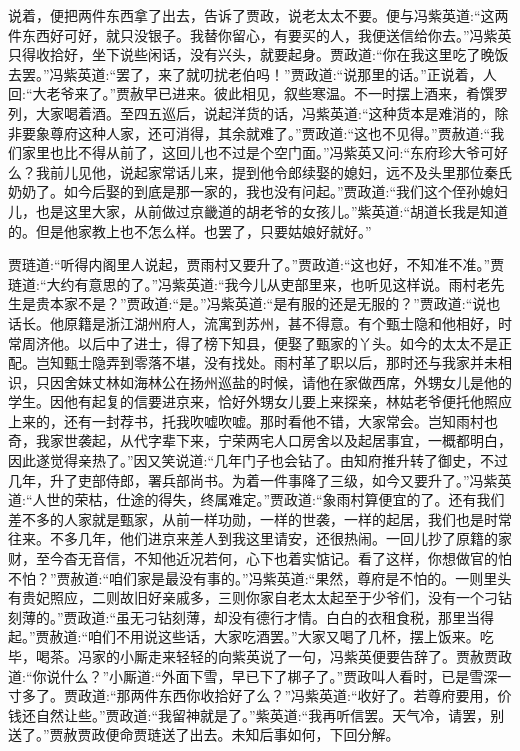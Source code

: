 \begin{parag}
    说着，便把两件东西拿了出去，告诉了贾政，说老太太不要。便与冯紫英道:“这两件东西好可好，就只没银子。我替你留心，有要买的人，我便送信给你去。”冯紫英只得收拾好，坐下说些闲话，没有兴头，就要起身。贾政道:“你在我这里吃了晚饭去罢。”冯紫英道:“罢了，来了就叨扰老伯吗！”贾政道:“说那里的话。”正说着，人回:“大老爷来了。”贾赦早已进来。彼此相见，叙些寒温。不一时摆上酒来，肴馔罗列，大家喝着酒。至四五巡后，说起洋货的话，冯紫英道:“这种货本是难消的，除非要象尊府这种人家，还可消得，其余就难了。”贾政道:“这也不见得。”贾赦道:“我们家里也比不得从前了，这回儿也不过是个空门面。”冯紫英又问:“东府珍大爷可好么？我前儿见他，说起家常话儿来，提到他令郎续娶的媳妇，远不及头里那位秦氏奶奶了。如今后娶的到底是那一家的，我也没有问起。”贾政道:“我们这个侄孙媳妇儿，也是这里大家，从前做过京畿道的胡老爷的女孩儿。”紫英道:“胡道长我是知道的。但是他家教上也不怎么样。也罢了，只要姑娘好就好。”
\end{parag}


\begin{parag}
    贾琏道:“听得内阁里人说起，贾雨村又要升了。”贾政道:“这也好，不知准不准。”贾琏道:“大约有意思的了。”冯紫英道:“我今儿从吏部里来，也听见这样说。雨村老先生是贵本家不是？”贾政道:“是。”冯紫英道:“是有服的还是无服的？”贾政道:“说也话长。他原籍是浙江湖州府人，流寓到苏州，甚不得意。有个甄士隐和他相好，时常周济他。以后中了进士，得了榜下知县，便娶了甄家的丫头。如今的太太不是正配。岂知甄士隐弄到零落不堪，没有找处。雨村革了职以后，那时还与我家并未相识，只因舍妹丈林如海林公在扬州巡盐的时候，请他在家做西席，外甥女儿是他的学生。因他有起复的信要进京来，恰好外甥女儿要上来探亲，林姑老爷便托他照应上来的，还有一封荐书，托我吹嘘吹嘘。那时看他不错，大家常会。岂知雨村也奇，我家世袭起，从代字辈下来，宁荣两宅人口房舍以及起居事宜，一概都明白，因此遂觉得亲热了。”因又笑说道:“几年门子也会钻了。由知府推升转了御史，不过几年，升了吏部侍郎，署兵部尚书。为着一件事降了三级，如今又要升了。”冯紫英道:“人世的荣枯，仕途的得失，终属难定。”贾政道:“象雨村算便宜的了。还有我们差不多的人家就是甄家，从前一样功勋，一样的世袭，一样的起居，我们也是时常往来。不多几年，他们进京来差人到我这里请安，还很热闹。一回儿抄了原籍的家财，至今杳无音信，不知他近况若何，心下也着实惦记。看了这样，你想做官的怕不怕？”贾赦道:“咱们家是最没有事的。”冯紫英道:“果然，尊府是不怕的。一则里头有贵妃照应，二则故旧好亲戚多，三则你家自老太太起至于少爷们，没有一个刁钻刻薄的。”贾政道:“虽无刁钻刻薄，却没有德行才情。白白的衣租食税，那里当得起。”贾赦道:“咱们不用说这些话，大家吃酒罢。”大家又喝了几杯，摆上饭来。吃毕，喝茶。冯家的小厮走来轻轻的向紫英说了一句，冯紫英便要告辞了。贾赦贾政道:“你说什么？”小厮道:“外面下雪，早已下了梆子了。”贾政叫人看时，已是雪深一寸多了。贾政道:“那两件东西你收拾好了么？”冯紫英道:“收好了。若尊府要用，价钱还自然让些。”贾政道:“我留神就是了。”紫英道:“我再听信罢。天气冷，请罢，别送了。”贾赦贾政便命贾琏送了出去。未知后事如何，下回分解。
\end{parag}